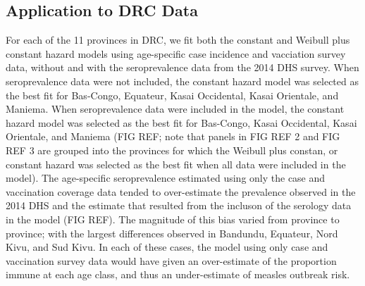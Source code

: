 \documentclass[nofootinbib,aps,pre,twocolumn,superscriptaddress,showkeys,showpacs]{revtex4-1}
\begin{document}
\subsection{Application to DRC Data \label{subsec:DRC}}

For each of the 11 provinces in DRC, we fit both the constant and Weibull plus constant hazard models using age-specific case incidence and vacciation survey data, without and with the seroprevalence data from the 2014 DHS survey. When seroprevalence data were not included, the constant hazard model was selected as the best fit for Bas-Congo, Equateur, Kasai Occidental, Kasai Orientale, and Maniema.  When seroprevalence data were included in the model, the constant hazard model was selected as the best fit for Bas-Congo, Kasai Occidental, Kasai Orientale, and Maniema (FIG REF; note that panels in FIG REF 2 and FIG REF 3 are grouped into the provinces for which the Weibull plus constan, or constant hazard was selected as the best fit when all data were included in the model).  The age-specific seroprevalence estimated using only the case and vaccination coverage data tended to over-estimate the prevalence observed in the 2014 DHS and the estimate that resulted from the incluson of the serology data in the model (FIG REF). The magnitude of this bias varied from province to province; with the largest differences observed in Bandundu, Equateur, Nord Kivu, and Sud Kivu. In each of these cases, the model using only case and vaccination survey data would have given an over-estimate of the proportion immune at each age class, and thus an under-estimate of measles outbreak risk. 
\end{document}

